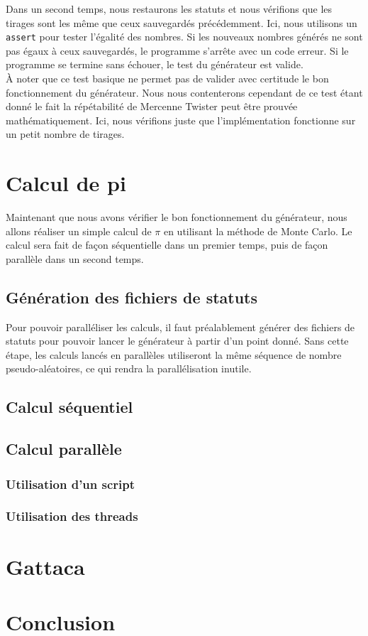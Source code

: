 \documentclass[a4paper]{article}
\begin{document}
Dans un second temps, nous restaurons les statuts et nous vérifions que les
tirages sont les même que ceux sauvegardés précédemment. Ici, nous utilisons un
\lstinline{assert} pour tester l'égalité des nombres. Si les nouveaux nombres
générés ne sont pas égaux à ceux sauvegardés, le programme s'arrête avec un code
erreur. Si le programme se termine sans échouer, le test du générateur est
valide.\\

À noter que ce test basique ne permet pas de valider avec certitude le bon
fonctionnement du générateur. Nous nous contenterons cependant de ce test étant
donné le fait la répétabilité de Mercenne Twister peut être prouvée
mathématiquement. Ici, nous vérifions juste que l'implémentation fonctionne sur
un petit nombre de tirages.

\section{Calcul de pi}

Maintenant que nous avons vérifier le bon fonctionnement du générateur, nous
allons réaliser un simple calcul de $\pi$ en utilisant la méthode de Monte
Carlo. Le calcul sera fait de façon séquentielle dans un premier temps, puis de
façon parallèle dans un second temps.

\subsection{Génération des fichiers de statuts}

Pour pouvoir paralléliser les calculs, il faut préalablement générer des
fichiers de statuts pour pouvoir lancer le générateur à partir d'un point donné.
Sans cette étape, les calculs lancés en parallèles utiliseront la même séquence
de nombre pseudo-aléatoires, ce qui rendra la parallélisation inutile.

\subsection{Calcul séquentiel}

\subsection{Calcul parallèle}

\subsubsection{Utilisation d'un script}

\subsubsection{Utilisation des threads}

\section{Gattaca}

\section{Conclusion}
\end{document}
